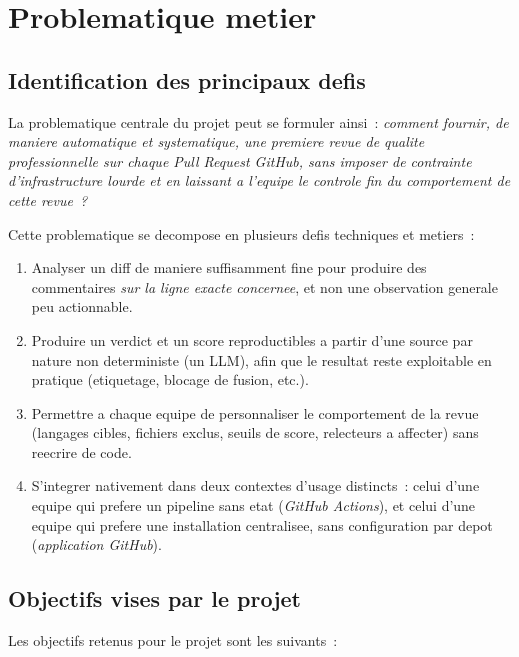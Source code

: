 \documentclass[a4paper,12pt,oneside]{report}
\begin{document}
\section{Problematique metier}

\subsection{Identification des principaux defis}

La problematique centrale du projet peut se formuler ainsi~: \emph{comment fournir, de maniere automatique et systematique, une premiere revue de qualite professionnelle sur chaque Pull Request GitHub, sans imposer de contrainte d'infrastructure lourde et en laissant a l'equipe le controle fin du comportement de cette revue~?}

Cette problematique se decompose en plusieurs defis techniques et metiers~:

\begin{enumerate}
  \item Analyser un diff de maniere suffisamment fine pour produire des commentaires \emph{sur la ligne exacte concernee}, et non une observation generale peu actionnable.
  \item Produire un verdict et un score reproductibles a partir d'une source par nature non deterministe (un LLM), afin que le resultat reste exploitable en pratique (etiquetage, blocage de fusion, etc.).
  \item Permettre a chaque equipe de personnaliser le comportement de la revue (langages cibles, fichiers exclus, seuils de score, relecteurs a affecter) sans reecrire de code.
  \item S'integrer nativement dans deux contextes d'usage distincts~: celui d'une equipe qui prefere un pipeline sans etat (\emph{GitHub Actions}), et celui d'une equipe qui prefere une installation centralisee, sans configuration par depot (\emph{application GitHub}).
\end{enumerate}

\subsection{Objectifs vises par le projet}

Les objectifs retenus pour le projet sont les suivants~:
\end{document}
